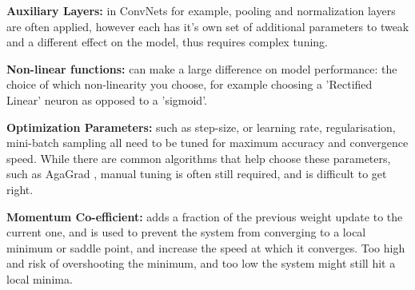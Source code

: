 \documentclass[a4paper,11pt,titlepage]{article}
\begin{document}
		\par 
		\textbf{Auxiliary Layers:} in ConvNets for example, pooling and normalization layers are often applied, however each has it's own set of additional parameters to tweak and a different effect on the model, thus requires complex tuning.
		\par 
		\textbf{Non-linear functions:} can make a large difference on model performance: the choice of which non-linearity you choose, for example choosing a 'Rectified Linear' neuron as opposed to a 'sigmoid'. 
		\par 
		\textbf{Optimization Parameters:} such as step-size, or learning rate, regularisation, mini-batch sampling all need to be tuned for maximum accuracy and convergence speed. While there are common algorithms that help choose these parameters, such as AgaGrad \cite{Duchi2011}, manual tuning is often still required, and is difficult to get right.
		\par
		\textbf{Momentum Co-efficient:} adds a fraction of the previous weight update to the current one, and is used to prevent the system from converging to a local minimum or saddle point, and increase the speed at which it converges. Too high and risk of overshooting the minimum, and too low the system might still hit a local minima.
		\par
		
		\begin{figure}[H]
    			\centering	
    			\qquad
    			\caption{}%
    			\label{fig:Dropout}
		\end{figure}
		
\end{document}
